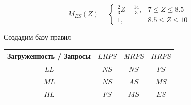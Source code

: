 \documentclass[a4paper,12pt]{article}
\begin{document}
\[
M_{ES}(Z) = \begin{cases}
\frac{2}{3}Z-\frac{14}{3}, & 7 \le Z \le 8.5 \\
1, & 8.5 \le Z \le 10
\end{cases}
\]
\newpage

\noindent
Создадим базу правил
\begin{table}[H]
    \centering
    \begin{tabular}{|c|c|c|c|}
    \hline
        Загруженность / Запросы & $LRPS$ & $MRPS$ & $HRPS$ \\ \hline
        $LL$ & $NS$ & $NS$ & $FS$ \\ \hline
        $ML$ & $NS$ & $AS$ & $MS$ \\ \hline
        $HL$ & $FS$ & $MS$ & $ES$ \\ \hline
    \end{tabular}
\end{table}
\end{document}
